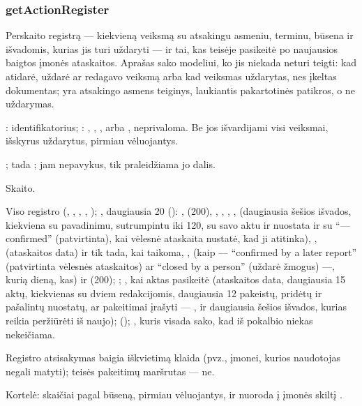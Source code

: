 \subsubsection{getActionRegister}\label{sec:tools:getActionRegister}
\begin{description}[style=multiline, leftmargin=19mm, labelwidth=17mm, labelsep=2mm,
  font=\sffamily\bfseries\footnotesize\color{ink}, itemsep=1pt, topsep=2pt, before=\raggedright]
  \item[Paskirtis] Perskaito registrą --- kiekvieną veiksmą su atsakingu asmeniu, terminu,
    būsena ir išvadomis, kurias jis turi uždaryti --- ir tai, kas teisėje pasikeitė po
    naujausios baigtos įmonės ataskaitos. Aprašas sako modeliui, ko jis niekada neturi teigti:
    kad atidarė, uždarė ar redagavo veiksmą arba kad veiksmas uždarytas, nes įkeltas
    dokumentas;  yra atsakingo asmens teiginys, laukiantis pakartotinės patikros, o ne
    uždarymas.
  \item[Įvestis] : identifikatorius; : , ,
    ,  arba , neprivaloma. Be jos išvardijami visi
    veiksmai, išskyrus uždarytus, pirmiau vėluojantys.
  \item[Užklausos] ; tada
    ; jam nepavykus, tik praleidžiama jo dalis.
  \item[Pobūdis] Skaito.
  \item[Grąžina] Viso registro  (, , ,
    , ); , daugiausia 20 ():
    ,  (200), , , , ,
     (daugiausia šešios išvados, kiekviena su pavadinimu, sutrumpintu iki 120, su
    savo aktu ir nuostata ir su \enquote{--- confirmed} (patvirtinta), kai vėlesnė ataskaita
    nustatė, kad ji atitinka), ,  (ataskaitos data) ir tik
    tada, kai taikoma, ,  (kaip --- \enquote{confirmed by a
    later report} (patvirtinta vėlesnės ataskaitos) ar \enquote{closed by a person} (uždarė
    žmogus) ---, kurią dieną, kas) ir  (200); ;
    , kai aktas pasikeitė (ataskaitos data, daugiausia 15 aktų, kiekvienas su
    dviem redakcijomis, daugiausia 12 pakeistų, pridėtų ir pašalintų nuostatų, ar pakeitimai
    įrašyti --- , ir daugiausia šešios išvados, kurias reikia peržiūrėti iš
    naujo);  (); , kuris visada sako,
    kad iš pokalbio niekas nekeičiama.
  \item[Klaidos] Registro atsisakymas baigia iškvietimą klaida (pvz.,  įmonei,
    kurios naudotojas negali matyti); teisės pakeitimų maršrutas --- ne.
  \item[Konsolė] Kortelė: skaičiai pagal būseną, pirmiau vėluojantys, ir nuoroda į įmonės
    skiltį .
\end{description}


